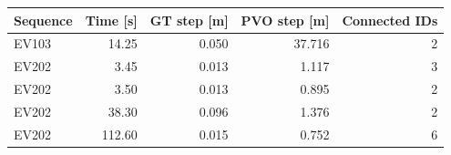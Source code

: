 \begin{tabular}{@{}lrrrr@{}}
\toprule
Sequence & Time [s] & GT step [m] & PVO step [m] & Connected IDs \\
\midrule
EV103 & 14.25 & 0.050 & 37.716 & 2 \\
EV202 & 3.45 & 0.013 & 1.117 & 3 \\
EV202 & 3.50 & 0.013 & 0.895 & 2 \\
EV202 & 38.30 & 0.096 & 1.376 & 2 \\
EV202 & 112.60 & 0.015 & 0.752 & 6 \\
\bottomrule
\end{tabular}
